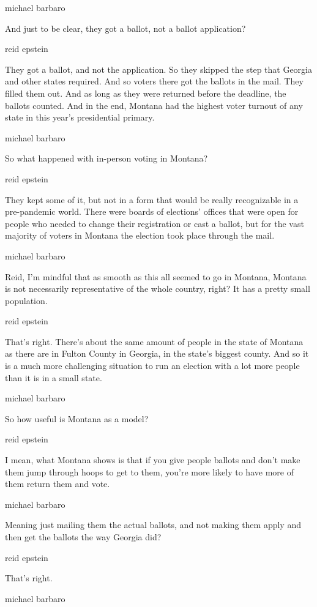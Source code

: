 michael barbaro

And just to be clear, they got a ballot, not a ballot application?

reid epstein

They got a ballot, and not the application. So they skipped the step
that Georgia and other states required. And so voters there got the
ballots in the mail. They filled them out. And as long as they were
returned before the deadline, the ballots counted. And in the end,
Montana had the highest voter turnout of any state in this year's
presidential primary.

michael barbaro

So what happened with in-person voting in Montana?

reid epstein

They kept some of it, but not in a form that would be really
recognizable in a pre-pandemic world. There were boards of elections'
offices that were open for people who needed to change their
registration or cast a ballot, but for the vast majority of voters in
Montana the election took place through the mail.

michael barbaro

Reid, I'm mindful that as smooth as this all seemed to go in Montana,
Montana is not necessarily representative of the whole country, right?
It has a pretty small population.

reid epstein

That's right. There's about the same amount of people in the state of
Montana as there are in Fulton County in Georgia, in the state's biggest
county. And so it is a much more challenging situation to run an
election with a lot more people than it is in a small state.

michael barbaro

So how useful is Montana as a model?

reid epstein

I mean, what Montana shows is that if you give people ballots and don't
make them jump through hoops to get to them, you're more likely to have
more of them return them and vote.

michael barbaro

Meaning just mailing them the actual ballots, and not making them apply
and then get the ballots the way Georgia did?

reid epstein

That's right.

michael barbaro

